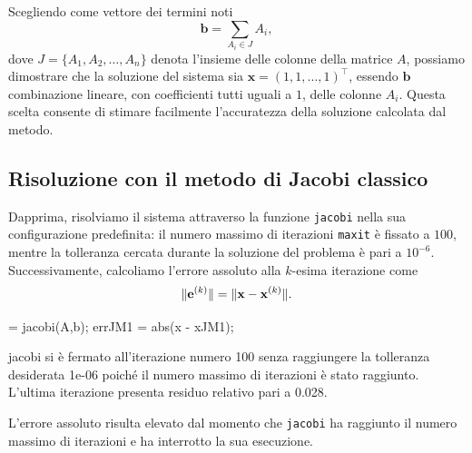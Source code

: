 Scegliendo come vettore dei termini noti
\begin{equation*}
    \mathbf{b} = \sum_ {A_{i} \in J} A_{i},
\end{equation*}
dove $J = \{A_{1}, A_{2},\dots,A_{n}\}$ denota l'insieme delle colonne della matrice $A$, possiamo dimostrare che la soluzione
del sistema sia $\mathbf{x} = (1, 1, ..., 1)^\top$, essendo $\mathbf{b}$ combinazione lineare, con coefficienti tutti uguali a $\num{1}$, delle colonne $A_{i}$. Questa scelta consente di stimare facilmente l'accuratezza della soluzione calcolata dal metodo.
\subsection{Risoluzione con il metodo di Jacobi classico}
Dapprima, risolviamo il sistema attraverso la funzione \lstinline{jacobi} nella sua configurazione predefinita:
il numero massimo di iterazioni \lstinline{maxit} \`e fissato a $\num{100}$, mentre la tolleranza cercata durante la soluzione del problema \`e pari a ${10}^{-6}$.\newline
    Successivamente, calcoliamo l'errore assoluto alla $k$-esima iterazione come
    \begin{equation*}
        \lVert\mathbf{e}^{(k)}\rVert = \lVert\mathbf{x} - \mathbf{x}^{(k)}\rVert.
    \end{equation*}
    \begin{matlabcode}
     = jacobi(A,b);
    errJM1 = abs(x - xJM1);
    \end{matlabcode}
    \begin{matlaboutput}
    jacobi si è fermato all'iterazione numero 100 senza
    raggiungere la tolleranza desiderata 1e-06 poiché il
    numero massimo di iterazioni è stato raggiunto.
    L'ultima iterazione presenta residuo relativo
    pari a 0.028.
    \end{matlaboutput}
    L'errore assoluto risulta elevato dal momento che \lstinline{jacobi} ha raggiunto il numero massimo di iterazioni e ha interrotto la sua esecuzione.

